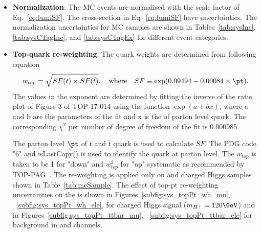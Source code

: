 \begin{itemize}
\item {\bf Normalization}: The MC events are normalised with the scale factor of 
    Eq.~\ref{eq:lumiSF}. The cross-section in Eq.~\ref{eq:lumiSF} have uncertainties. 
    The normalization uncertainties for MC samples are shown in 
    Tables~\ref{tab:sysInc}, \ref{tab:sysCTagInc}, and \ref{tab:sysCTagEx} for different event categories.
\item {\bf Top-quark \pt re-weighting}: The \PQt quark \pt weights are 
    determined from following equation
    \begin{equation}
    w_{top}=\sqrt{SF(t)\times SF(\bar{t})}, \quad{\rm where}\quad SF\equiv\exp(0.09494 - 0.00084\times\pt).
    \label{eq:top_wt}
    \end{equation}
    The values in the exponent are determined by fitting the inverse 
    of the ratio plot of Figure 3 of TOP-17-014 using the function
    $\exp(a + bx)$, where a and b are the parameters of the fit and x is
    the \pt of parton level \PQt quark. The corresponding $\chi^2$
    per number of  degree of freedom of the fit is 0.000985. 
    
    The parton level $\pt$ of $t$ and $\bar{t}$ quark is used to 
    calculate $SF$. The PDG code "6" and isLastCopy() is used to 
    identify the \PQt quark at parton level. The $w_{top}$ is taken to be 
    1 for "down" and $w_{top}^2$ for "up" systematic as recommended by 
    TOP-PAG~\cite{TopPtReweight}. The re-weighting is applied only 
    on \ttjets and charged Higgs samples shown in 
    Table~\ref{tab:mcSample}. The effect of top-pt re-weighting 
    uncertainties on the \mjj is shown in Figures~\ref{subfig:sys_topPt_wh_mu},
    ~\ref{subfig:sys_topPt_wh_ele}, for charged Higgs signal 
    ($m_{H^+} = 120 \GeV$) and in Figures~\ref{subfig:sys_topPt_ttbar_mu}, 
    ~\ref{subfig:sys_topPt_ttbar_ele} for \ttjets background in 
    \mujets and \ejets channels. 


\end{itemize}
